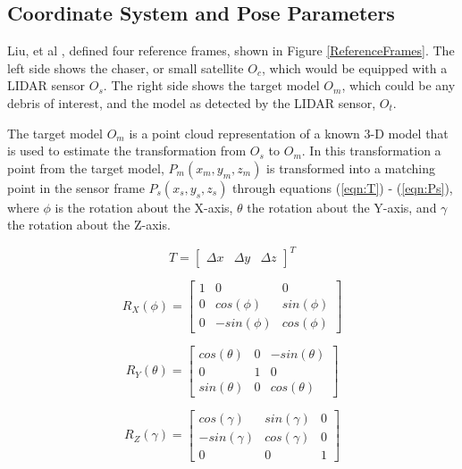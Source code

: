 \documentclass[conference]{IEEEtran}
\begin{document}
	\subsection{Coordinate System and Pose Parameters}
		Liu, et al \cite{liu2016point}, defined four reference frames, shown in Figure \ref{ReferenceFrames}. The left side shows the chaser, or small satellite $O_c$, which would be equipped with a LIDAR sensor $O_s$. The right side shows the target model $O_m$, which could be any debris of interest, and the model as detected by the LIDAR sensor, $O_t$.
		
		The target model $O_m$ is a point cloud representation of a known 3-D model that is used to estimate the transformation from $O_s$ to $O_m$. In this transformation a point from the target model, $P_m (x_m,y_m,z_m)$ is transformed into a matching point in the sensor frame $P_s (x_s,y_s,z_s)$ through equations (\ref{eqn:T}) - (\ref{eqn:Ps}), where $\phi$ is the rotation about the X-axis, $\theta$ the rotation about the Y-axis, and $\gamma$ the rotation about the Z-axis. 
		
		\begin{equation}
			\label{eqn:T}
			T = \begin{bmatrix} \Delta x  & \Delta y & \Delta z \end{bmatrix}^T
		\end{equation}

		\begin{equation}
		 	\label{eqn:Rx}
			R_X(\phi) = 
			\begin{bmatrix}
				1  & 0 & 0 \\
				0 & cos(\phi) & sin(\phi) \\
				0 & -sin(\phi) & cos(\phi)
			\end{bmatrix}
		\end{equation}
	
		\begin{equation}
			\label{eqn:Ry}
			R_Y(\theta) = 
			\begin{bmatrix}
				cos(\theta)  & 0 & -sin(\theta) \\
				0 & 1 & 0 \\
				sin(\theta) & 0 & cos(\theta)
			\end{bmatrix}
		\end{equation}
	
		\begin{equation}
			\label{eqn:Rz}
			R_Z(\gamma) = 
			\begin{bmatrix}
				cos(\gamma)  & sin(\gamma) & 0 \\
				-sin(\gamma) & cos(\gamma) & 0 \\
				0 & 0 & 1
			\end{bmatrix}
		\end{equation}
	
\end{document}
